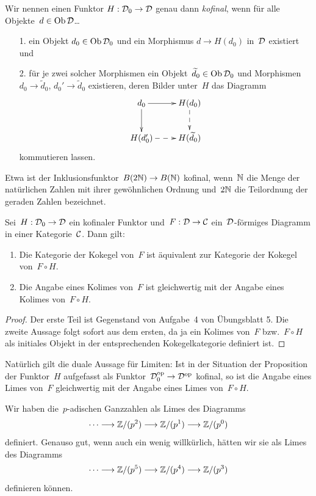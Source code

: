 \begin{defn}
Wir nennen einen Funktor $H : \mathcal{D}_0 \to \mathcal{D}$ genau dann \emph{kofinal}, wenn
für alle Objekte~$d \in \operatorname{Ob}\mathcal{D}$\ldots
\begin{enumerate}
\item[1.] ein Objekt $d_0 \in \operatorname{Ob}\mathcal{D}_0$ und ein Morphismus $d \to
H(d_0)$ in~$\mathcal{D}$ existiert und
\item[2.] für je zwei solcher Morphismen ein Objekt~$\widetilde d_0 \in \operatorname{Ob}\mathcal{D}_0$ und
Morphismen $d_0 \to \widetilde d_0$, $d_0' \to \widetilde d_0$ existieren, deren Bilder
unter~$H$ das Diagramm
\[ \xymatrix{
  d_0 \ar[r] \ar[d] & H(d_0) \ar@{-->}[d] \\
  H(d_0') \ar@{-->}[r] & H(\widetilde d_0)
} \]
kommutieren lassen.
\end{enumerate}
\end{defn}

Etwa ist der Inklusionsfunktor~$B (2\mathbb{N}) \to B(\mathbb{N})$ kofinal, wenn~$\mathbb{N}$ die
Menge der natürlichen Zahlen mit ihrer gewöhnlichen Ordnung und~$2\mathbb{N}$ die
Teilordnung der geraden Zahlen bezeichnet.

\begin{prop}
Sei~$H : \mathcal{D}_0 \to \mathcal{D}$ ein kofinaler Funktor und~$F : \mathcal{D} \to \mathcal{C}$
ein~$\mathcal{D}$-förmiges Diagramm in einer Kategorie~$\mathcal{C}$. Dann gilt:
\begin{enumerate}
\item Die Kategorie der Kokegel von~$F$ ist äquivalent zur Kategorie der
Kokegel von~$F \circ H$.
\item Die Angabe eines Kolimes von~$F$ ist gleichwertig mit der Angabe eines
Kolimes von~$F \circ H$.
\end{enumerate}
\end{prop}
\begin{proof}
Der erste Teil ist Gegenstand von Aufgabe~4 von Übungsblatt 5. Die zweite
Aussage folgt sofort aus dem ersten, da ja ein Kolimes von~$F$ bzw.~$F \circ H$
als initiales Objekt in der entsprechenden Kokegelkategorie definiert ist.
\end{proof}

Natürlich gilt die duale Aussage für Limiten: Ist in der Situation der
Proposition der Funktor~$H$ aufgefasst als Funktor~$\mathcal{D}_0^{\mathrm{op}} \to \mathcal{D}^{\mathrm{op}}$
kofinal, so ist die Angabe eines Limes von~$F$ gleichwertig mit der Angabe
eines Limes von~$F \circ H$.

\begin{bsp}Wir haben die~$p$-adischen Ganzzahlen als Limes des Diagramms
\[ \cdots \longrightarrow \mathbb{Z}/(p^2) \longrightarrow \mathbb{Z}/(p^1) \longrightarrow \mathbb{Z}/(p^0) \]
definiert. Genauso gut, wenn auch ein wenig willkürlich, hätten wir sie als
Limes des Diagramms
\[ \cdots \longrightarrow \mathbb{Z}/(p^5) \longrightarrow \mathbb{Z}/(p^4) \longrightarrow \mathbb{Z}/(p^3) \]
definieren können.\end{bsp}






